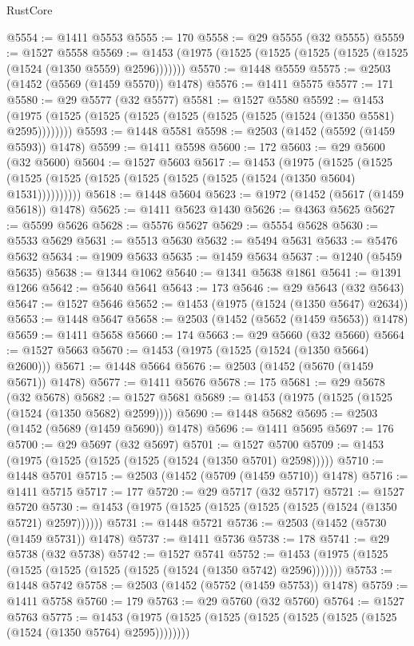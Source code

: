 \begin{lexlean}{RustCore}
\begin{coremodule}
@5554 := @1411 @5553
@5555 := 170
@5558 := @29 @5555 (@32 @5555)
@5559 := @1527 @5558
@5569 := @1453 (@1975 (@1525 (@1525 (@1525 (@1525 (@1525 (@1524 (@1350 @5559) @2596)))))))
@5570 := @1448 @5559
@5575 := @2503 (@1452 (@5569 (@1459 @5570)) @1478)
@5576 := @1411 @5575
@5577 := 171
@5580 := @29 @5577 (@32 @5577)
@5581 := @1527 @5580
@5592 := @1453 (@1975 (@1525 (@1525 (@1525 (@1525 (@1525 (@1525 (@1524 (@1350 @5581) @2595))))))))
@5593 := @1448 @5581
@5598 := @2503 (@1452 (@5592 (@1459 @5593)) @1478)
@5599 := @1411 @5598
@5600 := 172
@5603 := @29 @5600 (@32 @5600)
@5604 := @1527 @5603
@5617 := @1453
    (@1975
      (@1525 (@1525 (@1525 (@1525 (@1525 (@1525 (@1525 (@1525 (@1524 (@1350 @5604) @1531))))))))))
@5618 := @1448 @5604
@5623 := @1972 (@1452 (@5617 (@1459 @5618)) @1478)
@5625 := @1411 @5623 @1430
@5626 := @4363 @5625
@5627 := @5599 @5626
@5628 := @5576 @5627
@5629 := @5554 @5628
@5630 := @5533 @5629
@5631 := @5513 @5630
@5632 := @5494 @5631
@5633 := @5476 @5632
@5634 := @1909 @5633
@5635 := @1459 @5634
@5637 := @1240 (@5459 @5635)
@5638 := @1344 @1062
@5640 := @1341 @5638 @1861
@5641 := @1391 @1266
@5642 := @5640 @5641
@5643 := 173
@5646 := @29 @5643 (@32 @5643)
@5647 := @1527 @5646
@5652 := @1453 (@1975 (@1524 (@1350 @5647) @2634))
@5653 := @1448 @5647
@5658 := @2503 (@1452 (@5652 (@1459 @5653)) @1478)
@5659 := @1411 @5658
@5660 := 174
@5663 := @29 @5660 (@32 @5660)
@5664 := @1527 @5663
@5670 := @1453 (@1975 (@1525 (@1524 (@1350 @5664) @2600)))
@5671 := @1448 @5664
@5676 := @2503 (@1452 (@5670 (@1459 @5671)) @1478)
@5677 := @1411 @5676
@5678 := 175
@5681 := @29 @5678 (@32 @5678)
@5682 := @1527 @5681
@5689 := @1453 (@1975 (@1525 (@1525 (@1524 (@1350 @5682) @2599))))
@5690 := @1448 @5682
@5695 := @2503 (@1452 (@5689 (@1459 @5690)) @1478)
@5696 := @1411 @5695
@5697 := 176
@5700 := @29 @5697 (@32 @5697)
@5701 := @1527 @5700
@5709 := @1453 (@1975 (@1525 (@1525 (@1525 (@1524 (@1350 @5701) @2598)))))
@5710 := @1448 @5701
@5715 := @2503 (@1452 (@5709 (@1459 @5710)) @1478)
@5716 := @1411 @5715
@5717 := 177
@5720 := @29 @5717 (@32 @5717)
@5721 := @1527 @5720
@5730 := @1453 (@1975 (@1525 (@1525 (@1525 (@1525 (@1524 (@1350 @5721) @2597))))))
@5731 := @1448 @5721
@5736 := @2503 (@1452 (@5730 (@1459 @5731)) @1478)
@5737 := @1411 @5736
@5738 := 178
@5741 := @29 @5738 (@32 @5738)
@5742 := @1527 @5741
@5752 := @1453 (@1975 (@1525 (@1525 (@1525 (@1525 (@1525 (@1524 (@1350 @5742) @2596)))))))
@5753 := @1448 @5742
@5758 := @2503 (@1452 (@5752 (@1459 @5753)) @1478)
@5759 := @1411 @5758
@5760 := 179
@5763 := @29 @5760 (@32 @5760)
@5764 := @1527 @5763
@5775 := @1453 (@1975 (@1525 (@1525 (@1525 (@1525 (@1525 (@1525 (@1524 (@1350 @5764) @2595))))))))

\end{coremodule}
\end{lexlean}
